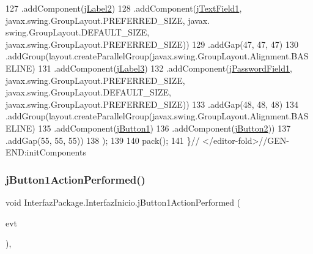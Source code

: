 \begin{DoxyCode}
127                     .addComponent(\mbox{\hyperlink{class_interfaz_package_1_1_interfaz_inicio_a57d053ea1c64fdb320d8930aaf4861e9}{jLabel2}})
128                     .addComponent(\mbox{\hyperlink{class_interfaz_package_1_1_interfaz_inicio_a6c0a79d5c225c996fd8e03141682afe7}{jTextField1}}, javax.swing.GroupLayout.PREFERRED\_SIZE, javax.
      swing.GroupLayout.DEFAULT\_SIZE, javax.swing.GroupLayout.PREFERRED\_SIZE))
129                 .addGap(47, 47, 47)
130                 .addGroup(layout.createParallelGroup(javax.swing.GroupLayout.Alignment.BASELINE)
131                     .addComponent(\mbox{\hyperlink{class_interfaz_package_1_1_interfaz_inicio_a680b59c8dabd737e6017bcb2fb35d93a}{jLabel3}})
132                     .addComponent(\mbox{\hyperlink{class_interfaz_package_1_1_interfaz_inicio_a8fde0bb0a462417298eaf6468976a838}{jPasswordField1}}, javax.swing.GroupLayout.PREFERRED\_SIZE, 
      javax.swing.GroupLayout.DEFAULT\_SIZE, javax.swing.GroupLayout.PREFERRED\_SIZE))
133                 .addGap(48, 48, 48)
134                 .addGroup(layout.createParallelGroup(javax.swing.GroupLayout.Alignment.BASELINE)
135                     .addComponent(\mbox{\hyperlink{class_interfaz_package_1_1_interfaz_inicio_ac4f7e3c32cd3ffd80b806828426752a5}{jButton1}})
136                     .addComponent(\mbox{\hyperlink{class_interfaz_package_1_1_interfaz_inicio_a0b17a44506b3f0598b3edabaae5099ec}{jButton2}}))
137                 .addGap(55, 55, 55))
138         );
139 
140         pack();
141     \}\textcolor{comment}{// </editor-fold>//GEN-END:initComponents}
\end{DoxyCode}
\mbox{\label{class_interfaz_package_1_1_interfaz_inicio_a3f0475181f93e77c393fb48e62d06d35}} 
\subsubsection{\texorpdfstring{j\+Button1\+Action\+Performed()}{jButton1ActionPerformed()}}
{\footnotesize\ttfamily void Interfaz\+Package.\+Interfaz\+Inicio.\+j\+Button1\+Action\+Performed (\begin{DoxyParamCaption}\item[{java.\+awt.\+event.\+Action\+Event}]{evt }\end{DoxyParamCaption})\hspace{0.3cm}{\ttfamily [inline]}, {\ttfamily [private]}}



